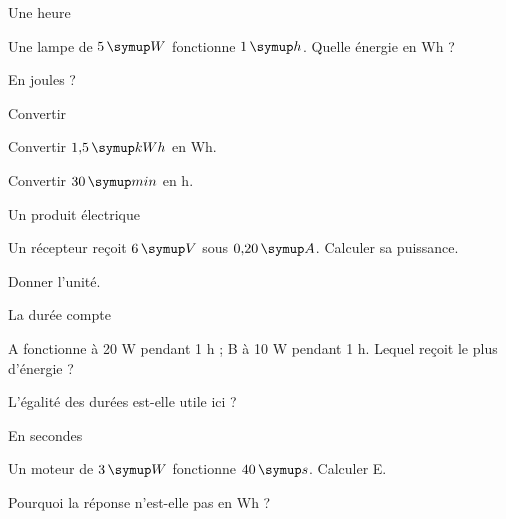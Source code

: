 \par\noindent\begin{minipage}{\linewidth}
\begin{exercice}[1]{Une heure}
\begin{questions}
\item Une lampe de $5\unite W$ fonctionne $1\unite h$. Quelle énergie en Wh ?
\item En joules ?
\end{questions}
\end{exercice}
\end{minipage}
\par\noindent\begin{minipage}{\linewidth}
\begin{exercice}[1]{Convertir}
\begin{questions}
\item Convertir $1{,}5\unite{kWh}$ en Wh.
\item Convertir $30\unite{min}$ en h.
\end{questions}
\end{exercice}
\end{minipage}
\par\noindent\begin{minipage}{\linewidth}
\begin{exercice}[1]{Un produit électrique}
\begin{questions}
\item Un récepteur reçoit $6\unite V$ sous $0{,}20\unite A$. Calculer sa puissance.
\item Donner l’unité.
\end{questions}
\end{exercice}
\end{minipage}
\par\noindent\begin{minipage}{\linewidth}
\begin{exercice}[1]{La durée compte}
\begin{questions}
\item A fonctionne à 20 W pendant 1 h ; B à 10 W pendant 1 h. Lequel reçoit le plus d’énergie ?
\item L’égalité des durées est-elle utile ici ?
\end{questions}
\end{exercice}
\end{minipage}
\clearpage{}
\par\noindent\begin{minipage}{\linewidth}
\begin{exercice}[2]{En secondes}
\begin{questions}
\item Un moteur de $3\unite W$ fonctionne $40\unite s$. Calculer E.
\item Pourquoi la réponse n’est-elle pas en Wh ?
\end{questions}
\end{exercice}
\end{minipage}
